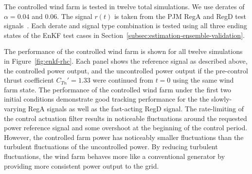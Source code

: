The controlled wind farm is tested in twelve total simulations. We use derates of $\alpha = 0.04$ and 0.06. The signal $r(t)$ is taken from the PJM RegA and RegD test signals~\cite{PJMm11, PJMm12}.  Each derate and signal type combination is tested using all three ending states of the EnKF test cases in Section~\ref{subsec:estimation-ensemble-validation}.

The performance of the controlled wind farm is shown for all twelve simulations in Figure~\ref{fig:enkf-rhc}. Each panel shows the reference signal as described above, the controlled power output, and the uncontrolled power output if the pre-control thrust coefficient $C_{Tn}' = 1.33$ were continued from $t=0$ using the same wind farm state. The performance of the controlled wind farm under the first two initial conditions demonstrate good tracking performance for the the slowly-varying RegA signals as well as the fast-acting RegD signal. The rate-limiting of the control actuation filter results in noticeable fluctuations around the requested power reference signal and some overshoot at the beginning of the control period. However, the controlled farm power has noticeably smaller fluctuations than the turbulent fluctuations of the uncontrolled power. By reducing turbulent fluctuations, the wind farm behaves more like a conventional generator by providing more consistent power output to the grid.


